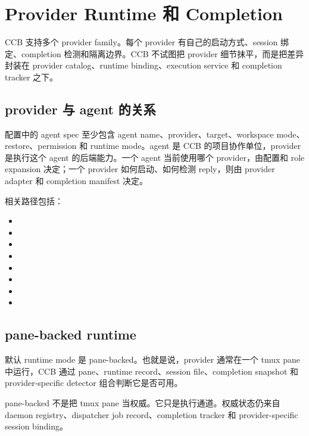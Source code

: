 \chapter{Provider Runtime 和 Completion}

CCB 支持多个 provider family。每个 provider 有自己的启动方式、session 绑定、completion 检测和隔离边界。CCB 不试图把 provider 细节抹平，而是把差异封装在 provider catalog、runtime binding、execution service 和 completion tracker 之下。

\section{provider 与 agent 的关系}

配置中的 agent spec 至少包含 agent name、provider、target、workspace mode、restore、permission 和 runtime mode。agent 是 CCB 的项目协作单位，provider 是执行这个 agent 的后端能力。一个 agent 当前使用哪个 provider，由配置和 role expansion 决定；一个 provider 如何启动、如何检测 reply，则由 provider adapter 和 completion manifest 决定。

相关路径包括：

\begin{itemize}
  \item {}
  \item {}
  \item {}
  \item {}
  \item {}
  \item {}
  \item {}
  \item {}
\end{itemize}

\section{pane-backed runtime}

默认 runtime mode 是 pane-backed。也就是说，provider 通常在一个 tmux pane 中运行，CCB 通过 pane、runtime record、session file、completion snapshot 和 provider-specific detector 组合判断它是否可用。

pane-backed 不是把 tmux pane 当权威。它只是执行通道。权威状态仍来自 daemon registry、dispatcher job record、completion tracker 和 provider-specific session binding。

